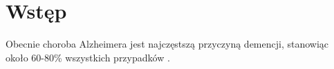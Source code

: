 \chapter*{Wstęp}

Obecnie choroba Alzheimera jest najczęstszą przyczyną demencji, stanowiąc około 60-80\% wszystkich przypadków \cite{alzheimers:2023}.
